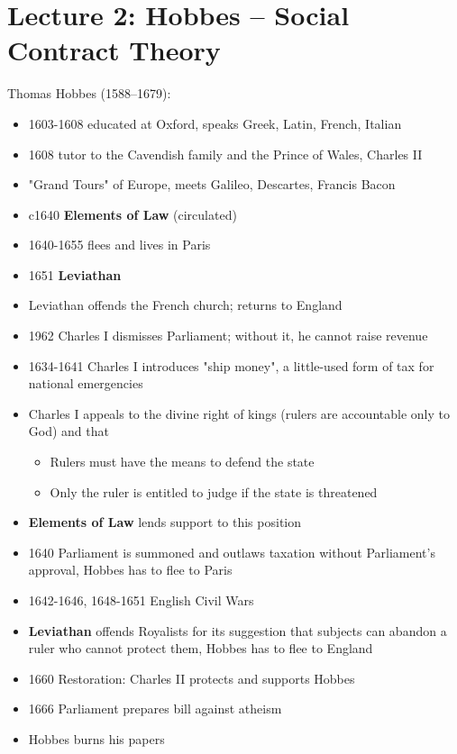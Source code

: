 \section{Lecture 2: Hobbes -- Social Contract Theory}

Thomas Hobbes (1588--1679):

\begin{itemize}
    \item 1603-1608 educated at Oxford, speaks Greek, Latin, French, Italian
    \item 1608 tutor to the Cavendish family and the Prince of Wales, Charles II
    \item "Grand Tours" of Europe, meets Galileo, Descartes, Francis Bacon
    \item c1640 \textbf{Elements of Law} (circulated)
    \item 1640-1655 flees and lives in Paris
    \item 1651 \textbf{Leviathan}
    \item Leviathan offends the French church; returns to England
\end{itemize}

\begin{itemize}
    \item 1962 Charles I dismisses Parliament; without it, he cannot raise
    revenue
    \item 1634-1641 Charles I introduces "ship money", a little-used form of
    tax for national emergencies
    \item Charles I appeals to the divine right of kings (rulers are
    accountable only to God) and that
    \begin{itemize}
        \item Rulers must have the means to defend the state
        \item Only the ruler is entitled to judge if the state is threatened
    \end{itemize}
    \item \textbf{Elements of Law} lends support to this position
\end{itemize}

\begin{itemize}
    \item 1640 Parliament is summoned and outlaws taxation without Parliament's
    approval, Hobbes has to flee to Paris
    \item 1642-1646, 1648-1651 English Civil Wars
    \item \textbf{Leviathan} offends Royalists for its suggestion that
    subjects can abandon a ruler who cannot protect them, Hobbes has to flee to
    England
    \item 1660 Restoration: Charles II protects and supports Hobbes
    \item 1666 Parliament prepares bill against atheism
    \item Hobbes burns his papers
\end{itemize}

